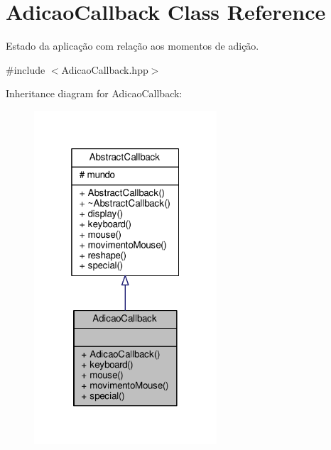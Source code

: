 \hypertarget{classAdicaoCallback}{\section{Adicao\+Callback Class Reference}
\label{classAdicaoCallback}
}


Estado da aplicação com relação aos momentos de adição.  




{\ttfamily \#include $<$Adicao\+Callback.\+hpp$>$}



Inheritance diagram for Adicao\+Callback\+:
\nopagebreak
\begin{figure}[H]
\begin{center}
\leavevmode
\includegraphics[width=193pt]{classAdicaoCallback__inherit__graph}
\end{center}
\end{figure}


